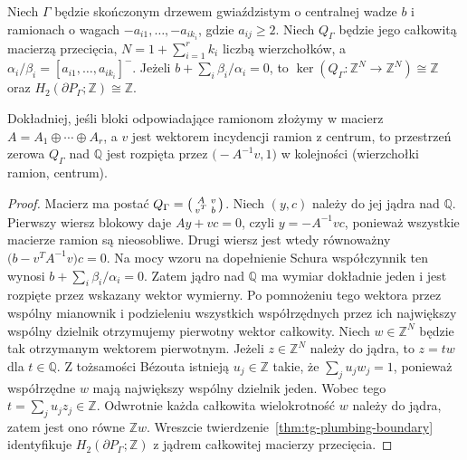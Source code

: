 \begin{wniosek}
\label{cor:tg-star-nullspace-boundary}
Niech $\Gamma$ będzie skończonym drzewem gwiaździstym
o centralnej wadze $b$ i ramionach o wagach
$-a_{i1},\ldots,-a_{ik_i}$, gdzie $a_{ij}\ge2$.
Niech $Q_\Gamma$ będzie jego całkowitą macierzą przecięcia,
$N=1+\sum_{i=1}^r k_i$ liczbą wierzchołków,
a $\alpha_i/\beta_i=[a_{i1},\ldots,a_{ik_i}]^-$.
Jeżeli $b+\sum_i\beta_i/\alpha_i=0$, to
$\ker(Q_\Gamma:\mathbb Z^N\to\mathbb Z^N)\cong\mathbb Z$
oraz $H_2(\partial P_\Gamma;\mathbb Z)\cong\mathbb Z$.

Dokładniej, jeśli bloki odpowiadające ramionom złożymy
w macierz $A=A_1\oplus\cdots\oplus A_r$,
a $v$ jest wektorem incydencji ramion z centrum,
to przestrzeń zerowa $Q_\Gamma$ nad $\mathbb Q$
jest rozpięta przez
$\bigl(-A^{-1}v,1\bigr)$ w kolejności
(wierzchołki ramion, centrum).
\end{wniosek}
\begin{proof}
Macierz ma postać
$Q_\Gamma=\begin{psmallmatrix}A&v\\v^T&b\end{psmallmatrix}$.
Niech $(y,c)$ należy do jej jądra nad $\mathbb Q$.
Pierwszy wiersz blokowy daje $Ay+vc=0$,
czyli $y=-A^{-1}vc$, ponieważ wszystkie
macierze ramion są nieosobliwe.
Drugi wiersz jest wtedy równoważny
$\bigl(b-v^TA^{-1}v\bigr)c=0$.
Na mocy wzoru na dopełnienie Schura
współczynnik ten wynosi
$b+\sum_i\beta_i/\alpha_i=0$.
Zatem jądro nad $\mathbb Q$ ma wymiar dokładnie jeden
i jest rozpięte przez wskazany wektor wymierny.
Po pomnożeniu tego wektora przez wspólny mianownik
i podzieleniu wszystkich współrzędnych przez ich
największy wspólny dzielnik otrzymujemy
pierwotny wektor całkowity. Niech $w\in\mathbb Z^N$ będzie tak otrzymanym
wektorem pierwotnym. Jeżeli $z\in\mathbb Z^N$
należy do jądra, to $z=t w$ dla $t\in\mathbb Q$.
Z tożsamości Bézouta istnieją $u_j\in\mathbb Z$
takie, że $\sum_j u_jw_j=1$, ponieważ współrzędne
$w$ mają największy wspólny dzielnik jeden.
Wobec tego $t=\sum_j u_jz_j\in\mathbb Z$.
Odwrotnie każda całkowita wielokrotność $w$
należy do jądra, zatem jest ono równe $\mathbb Zw$.
Wreszcie twierdzenie~\ref{thm:tg-plumbing-boundary}
identyfikuje $H_2(\partial P_\Gamma;\mathbb Z)$
z jądrem całkowitej macierzy przecięcia.
\end{proof}

